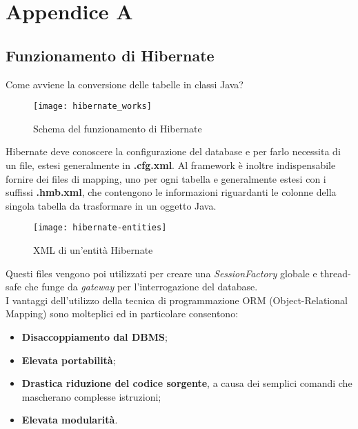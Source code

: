 
\chapter{Appendice A}

\section{Funzionamento di Hibernate} %
Come avviene la conversione delle tabelle in classi Java?\\
\begin{figure}[h]
	\centering
	\texttt{[image: hibernate\_works]}
	\caption{Schema del funzionamento di Hibernate}
	\label{schema-generale}
\end{figure}
Hibernate deve conoscere la configurazione del database e per farlo necessita di un file, estesi generalmente in \textbf{.cfg.xml}. Al framework è inoltre indispensabile fornire dei files di mapping, uno per ogni tabella e generalmente estesi con i suffissi \textbf{.hmb.xml}, che contengono le informazioni riguardanti le colonne della singola tabella da trasformare in un oggetto Java.\\

\begin{figure}[h]
	\centering
	\texttt{[image: hibernate-entities]}
	\caption{XML di un'entità Hibernate}
	\label{entità}
\end{figure}

Questi files vengono poi utilizzati per creare una \emph{SessionFactory} globale e thread-safe che funge da \emph{gateway} per l'interrogazione del database. \\ I vantaggi dell'utilizzo della tecnica di programmazione ORM (Object-Relational Mapping) sono molteplici ed in particolare consentono:
\begin{itemize}
	\item \textbf{Disaccoppiamento dal DBMS};
	\item \textbf{Elevata portabilità};
	\item \textbf{Drastica riduzione del codice sorgente}, a causa dei semplici comandi che mascherano complesse istruzioni;
	\item \textbf{Elevata modularità}.
\end{itemize}



